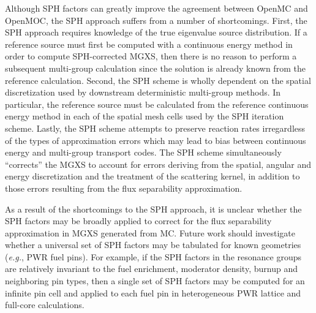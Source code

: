 Although SPH factors can greatly improve the agreement between OpenMC and OpenMOC, the SPH approach suffers from a number of shortcomings. First, the SPH approach requires knowledge of the true eigenvalue source distribution. If a reference source must first be computed with a continuous energy method in order to compute SPH-corrected MGXS, then there is no reason to perform a subsequent multi-group calculation since the solution is already known from the reference calculation. Second, the SPH scheme is wholly dependent on the spatial discretization used by downstream deterministic multi-group methods. In particular, the reference source must be calculated from the reference continuous energy method in each of the spatial mesh cells used by the SPH iteration scheme. Lastly, the SPH scheme attempts to preserve reaction rates irregardless of the types of approximation errors which may lead to bias between continuous energy and multi-group transport codes. The SPH scheme simultaneously ``corrects'' the MGXS to account for errors deriving from the spatial, angular and energy discretization and the treatment of the scattering kernel, in addition to those errors resulting from the flux separability approximation.

As a result of the shortcomings to the SPH approach, it is unclear whether the SPH factors may be broadly applied to correct for the flux separability approximation in MGXS generated from MC. Future work should investigate whether a universal set of SPH factors may be tabulated for known geometries (\textit{e.g.}, PWR fuel pins). For example, if the SPH factors in the resonance groups are relatively invariant to the fuel enrichment, moderator density, burnup  and neighboring pin types, then a single set of SPH factors may be computed for an infinite pin cell and applied to each fuel pin in heterogeneous PWR lattice and full-core calculations.

